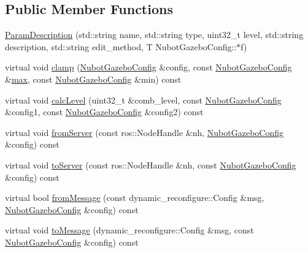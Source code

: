 \subsection*{Public Member Functions}
\begin{DoxyCompactItemize}
\item 
\hyperlink{classnubot__gazebo_1_1NubotGazeboConfig_1_1ParamDescription_a47a168a730a77a1b4fee7e13c39e3da7}{Param\-Description} (std\-::string name, std\-::string type, uint32\-\_\-t level, std\-::string description, std\-::string edit\-\_\-method, T Nubot\-Gazebo\-Config\-::$\ast$f)
\item 
virtual void \hyperlink{classnubot__gazebo_1_1NubotGazeboConfig_1_1ParamDescription_aeba0fdbc61e15a23e89737c4a83b439f}{clamp} (\hyperlink{classnubot__gazebo_1_1NubotGazeboConfig}{Nubot\-Gazebo\-Config} \&config, const \hyperlink{classnubot__gazebo_1_1NubotGazeboConfig}{Nubot\-Gazebo\-Config} \&\hyperlink{NubotGazeboConfig_8dox_a55c9de72d9f3630abdf51bfe39c191dd}{max}, const \hyperlink{classnubot__gazebo_1_1NubotGazeboConfig}{Nubot\-Gazebo\-Config} \&min) const 
\item 
virtual void \hyperlink{classnubot__gazebo_1_1NubotGazeboConfig_1_1ParamDescription_a1e1a067428b818201102fcbf15a3dad1}{calc\-Level} (uint32\-\_\-t \&comb\-\_\-level, const \hyperlink{classnubot__gazebo_1_1NubotGazeboConfig}{Nubot\-Gazebo\-Config} \&config1, const \hyperlink{classnubot__gazebo_1_1NubotGazeboConfig}{Nubot\-Gazebo\-Config} \&config2) const 
\item 
virtual void \hyperlink{classnubot__gazebo_1_1NubotGazeboConfig_1_1ParamDescription_a86056f8349d4a5f44d31f4c76b7bf52a}{from\-Server} (const ros\-::\-Node\-Handle \&nh, \hyperlink{classnubot__gazebo_1_1NubotGazeboConfig}{Nubot\-Gazebo\-Config} \&config) const 
\item 
virtual void \hyperlink{classnubot__gazebo_1_1NubotGazeboConfig_1_1ParamDescription_adc6e0d0145a31279a11a8df353889de4}{to\-Server} (const ros\-::\-Node\-Handle \&nh, const \hyperlink{classnubot__gazebo_1_1NubotGazeboConfig}{Nubot\-Gazebo\-Config} \&config) const 
\item 
virtual bool \hyperlink{classnubot__gazebo_1_1NubotGazeboConfig_1_1ParamDescription_a001650894d35bbcee247fdca39ff87fc}{from\-Message} (const dynamic\-\_\-reconfigure\-::\-Config \&msg, \hyperlink{classnubot__gazebo_1_1NubotGazeboConfig}{Nubot\-Gazebo\-Config} \&config) const 
\item 
virtual void \hyperlink{classnubot__gazebo_1_1NubotGazeboConfig_1_1ParamDescription_af50c2fa3ca6b5db9be337998218cd92e}{to\-Message} (dynamic\-\_\-reconfigure\-::\-Config \&msg, const \hyperlink{classnubot__gazebo_1_1NubotGazeboConfig}{Nubot\-Gazebo\-Config} \&config) const 

\end{DoxyCompactItemize}
